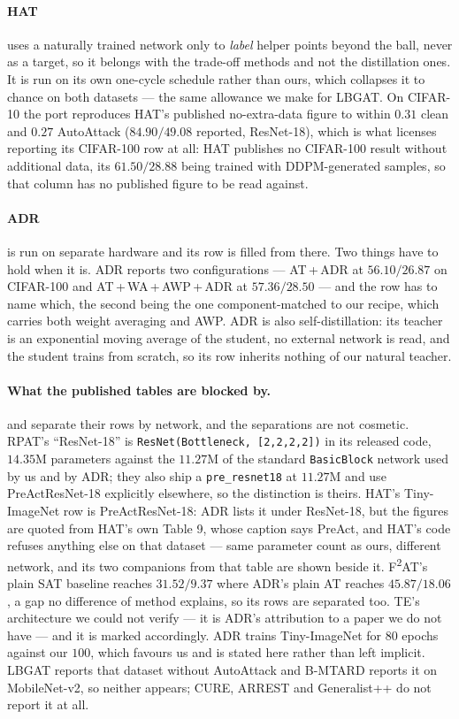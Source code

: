 \paragraph{HAT} uses a naturally trained network only to \emph{label} helper points beyond the ball,
never as a target, so it belongs with the trade-off methods and not the distillation ones. It is run
on its own one-cycle schedule rather than ours, which collapses it to chance on both datasets --- the
same allowance we make for LBGAT. On CIFAR-10 the port reproduces HAT's published no-extra-data figure
to within $0.31$ clean and $0.27$ AutoAttack ($84.90 / 49.08$ reported, ResNet-18), which is what
licenses reporting its CIFAR-100 row at all: HAT publishes no CIFAR-100 result without additional data,
its $61.50 / 28.88$ being trained with DDPM-generated samples, so that column has no published figure
to be read against.

\paragraph{ADR} is run on separate hardware and its row is filled from there. Two things have to hold
when it is. ADR reports two configurations --- AT\,+\,ADR at $56.10 / 26.87$ on CIFAR-100 and
AT\,+\,WA\,+\,AWP\,+\,ADR at $57.36 / 28.50$ --- and the row has to name which, the second being the
one component-matched to our recipe, which carries both weight averaging and AWP. ADR is also
self-distillation: its teacher is an exponential moving average of the student, no external network is
read, and the student trains from scratch, so its row inherits nothing of our natural teacher.

\paragraph{What the published tables are blocked by.}  and
 separate their rows by network, and the separations are not cosmetic. RPAT's
``ResNet-18'' is \texttt{ResNet(Bottleneck, [2,2,2,2])} in its released code, $14.35$M parameters
against the $11.27$M of the standard \texttt{BasicBlock} network used by us and by ADR; they also ship
a \texttt{pre\_resnet18} at $11.27$M and use PreActResNet-18 explicitly elsewhere, so the distinction
is theirs. HAT's Tiny-ImageNet row is PreActResNet-18: ADR lists it under ResNet-18, but the figures
are quoted from HAT's own Table 9, whose caption says PreAct, and HAT's code refuses anything else on
that dataset --- same parameter count as ours, different network, and its two companions from that
table are shown beside it. F\textsuperscript{2}AT's plain SAT baseline reaches $31.52 / 9.37$ where
ADR's plain AT reaches $45.87 / 18.06$, a gap no difference of method explains, so its rows are
separated too. TE's architecture we could not verify --- it is ADR's attribution to a paper we do not
have --- and it is marked accordingly. ADR trains Tiny-ImageNet for $80$ epochs against our $100$,
which favours us and is stated here rather than left implicit. LBGAT reports that dataset without
AutoAttack and B-MTARD reports it on MobileNet-v2, so neither appears; CURE, ARREST and Generalist++
do not report it at all.

